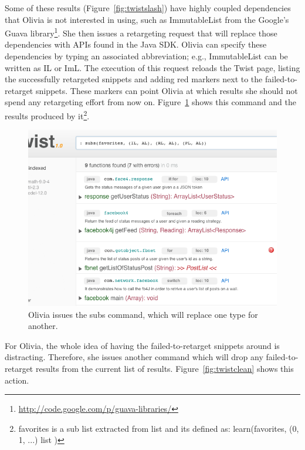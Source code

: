 Some of these results (Figure~\ref{fig:twistslash}) have highly coupled dependencies that Olivia is not interested in using, such as ImmutableList from the Google's Guava library\footnote{\url{http://code.google.com/p/guava-libraries/}}. She then issues a retargeting request that will replace those dependencies with APIs found in the Java SDK. Olivia can specify these dependencies by typing an associated abbreviation; e.g., ImmutableList can be written as IL or ImL. The execution of this request reloads the Twist page, listing the successfully retargeted snippets and adding red markers next to the failed-to-retarget snippets.  These markers can point Olivia at which results she should not spend any retargeting effort from now on. Figure~\ref{fig:twistretarget} shows this command and the results produced by it\footnote{favorites is a sub list extracted from list and its defined as: learn(favorites, (0, 1, ...) list )}. 

\begin{figure}[!ht]
    \centering
    \includegraphics[width=\textwidth]{images/twistretarget}
    \caption{Olivia issues the subs command, which will replace one type for 
	 another.}
    \label{fig:twistretarget}
\end{figure} 

For Olivia, the whole idea of having the failed-to-retarget snippets around is distracting. Therefore, she issues another command which will drop any failed-to-retarget results from the current list of results. Figure~\ref{fig:twistclean} shows this action. 

